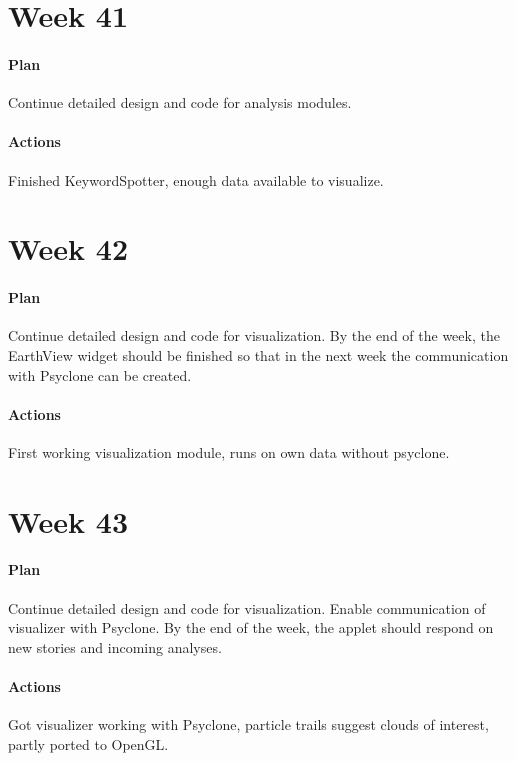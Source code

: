 \section{Week 41}

\paragraph{Plan} Continue detailed design and code for analysis modules.

\paragraph{Actions} Finished KeywordSpotter, enough data available to
visualize.

\section{Week 42}

\paragraph{Plan} Continue detailed design and code for visualization. By the
end of the week, the EarthView widget should be finished so that in the next
week the communication with Psyclone can be created.

\paragraph{Actions} First working visualization module, runs on own data
without psyclone.

\section{Week 43}

\paragraph{Plan} Continue detailed design and code for visualization. Enable
communication of visualizer with Psyclone. By the end of the week, the applet
should respond on new stories and incoming analyses.

\paragraph{Actions} Got visualizer working with Psyclone, particle trails
suggest clouds of interest, partly ported to OpenGL.

